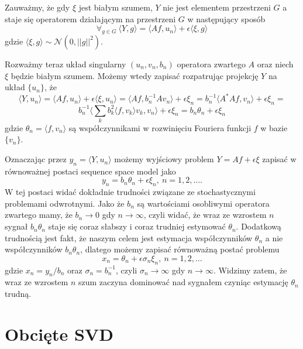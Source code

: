 \documentclass[10pt]{mwart}
\begin{document}
Zauważmy, że gdy $\xi$ jest białym szumem, $Y$ nie jest elementem przestrzeni $G$ a staje się operatorem działającym na przestrzeni $G$ w następujący sposób
\begin{displaymath}
\forall_{g\in G}\ \langle Y,g\rangle =\langle Af,u_n\rangle + \epsilon\langle \xi, g\rangle
\end{displaymath}
gdzie $\langle \xi, g\rangle\sim\mathcal{N}(0,||g||^2)$.

Rozważmy teraz układ singularny $(u_n,v_n,b_n)$ operatora zwartego $A$ oraz niech $\xi$ będzie białym szumem. Możemy wtedy zapisać rozpatrując projekcję $Y$ na układ $\{u_n\}$, że
\begin{displaymath}
\langle Y,u_n\rangle=\langle Af,u_n\rangle +\epsilon\langle \xi, u_n\rangle=\langle Af,b_n^{-1}Av_n\rangle+\epsilon \xi_n=b_n^{-1}\langle A^*Af, v_n\rangle+\epsilon \xi_n=
\end{displaymath}
\begin{displaymath}
b_n^{-1}\langle \sum_kb_k^2\langle f, v_k\rangle v_k, v_n\rangle +\epsilon\xi_n=b_n\theta_n+\epsilon\xi_n
\end{displaymath}
gdzie $\theta_n=\langle f,v_n\rangle$ są współczynnikami w rozwinięciu Fouriera funkcji $f$ w bazie $\{v_n\}$. 

Oznaczając przez $y_n=\langle Y,u_n\rangle$ możemy wyjściowy problem $Y=Af+\epsilon\xi$ zapisać w równoważnej postaci sequence space model jako
\begin{displaymath}
y_n=b_n\theta_n+\epsilon\xi_n,\ n=1,2,\dots.
\end{displaymath}
W tej postaci widać dokładnie trudności związane ze stochastycznymi problemami odwrotnymi. Jako że $b_n$ są wartościami osobliwymi operatora zwartego mamy, że $b_n\to 0$ gdy $n\to \infty$, czyli widać, że wraz ze wzrostem $n$ sygnał $b_n\theta_n$ staje się coraz słabszy i coraz trudniej estymować $\theta_n$. Dodatkową trudnością jest fakt, że naszym celem jest estymacja współczynników $\theta_n$ a nie współczynników $b_n\theta_n$, dlatego możemy zapisać równoważną postać problemu
\begin{displaymath}
x_n=\theta_n+\epsilon\sigma_n\xi_n,\ n=1,2,\dots
\end{displaymath}
gdzie $x_n=y_n/b_n$ oraz $\sigma_n=b_n^{-1}$, czyli $\sigma_n\to \infty$ gdy $n\to \infty$. Widzimy zatem, że wraz ze wzrostem $n$ szum zaczyna dominować nad sygnałem czyniąc estymację $\theta_n$ trudną.


\section{Obcięte SVD}
\end{document}
